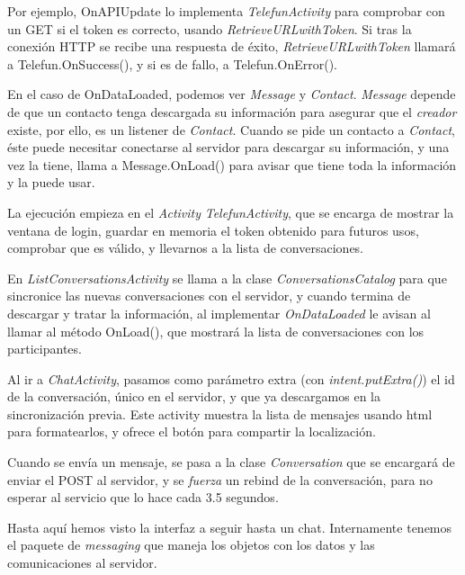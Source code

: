 \documentclass[]{article}
\begin{document}
Por ejemplo, OnAPIUpdate lo implementa \textit{TelefunActivity} para comprobar con un GET si el token es correcto, usando \textit{RetrieveURLwithToken}. Si tras la conexión HTTP se recibe una respuesta de éxito, \textit{RetrieveURLwithToken} llamará a Telefun.OnSuccess(), y si es de fallo, a Telefun.OnError().

En el caso de OnDataLoaded, podemos ver \textit{Message} y \textit{Contact}. \textit{Message} depende de que un contacto tenga descargada su información para asegurar que el \textit{creador} existe, por ello, es un listener de \textit{Contact}. Cuando se pide un contacto a \textit{Contact}, éste puede necesitar conectarse al servidor para descargar su información, y una vez la tiene, llama a Message.OnLoad() para avisar que tiene toda la información y la puede usar.

\hfill

\hfill

La ejecución empieza en el \textit{Activity} \textit{TelefunActivity}, que se encarga de mostrar la ventana de login, guardar en memoria el token obtenido para futuros usos, comprobar que es válido, y llevarnos a la lista de conversaciones.

\hfill


En \textit{ListConversationsActivity} se llama a la clase \textit{ConversationsCatalog} para que sincronice las nuevas conversaciones con el servidor, y cuando termina de descargar y tratar la información, al implementar \textit{OnDataLoaded} le avisan al llamar al método OnLoad(), que mostrará la lista de conversaciones con los participantes.

\hfill

Al ir a \textit{ChatActivity}, pasamos como parámetro extra (con \textit{intent.putExtra()}) el id de la conversación, único en el servidor, y que ya descargamos en la sincronización previa. Este activity muestra la lista de mensajes usando html para formatearlos, y ofrece el botón para compartir la localización.

Cuando se envía un mensaje, se pasa a la clase \textit{Conversation} que se encargará de enviar el POST al servidor, y se \textit{fuerza} un rebind de la conversación, para no esperar al servicio que lo hace cada 3.5 segundos.

\hfill

Hasta aquí hemos visto la interfaz a seguir hasta un chat. Internamente tenemos el paquete de \textit{messaging} que maneja los objetos con los datos y las comunicaciones al servidor.
\end{document}
